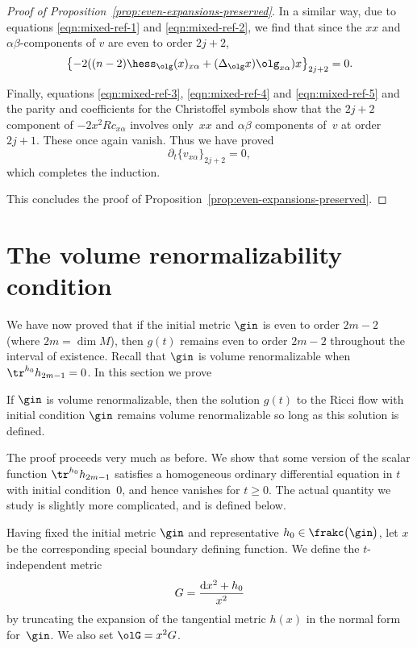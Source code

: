 \begin{proof}[Proof of Proposition~\ref{prop:even-expansions-preserved}]
In a similar way, due to equations \eqref{eqn:mixed-ref-1} and \eqref{eqn:mixed-ref-2}, we find that since the $xx$ and $\alpha \beta$-components of $v$ are even to order $2j+2$,
\begin{gather*} \big\{ {-}2 ( (n-2) \hess_{\olg} (x)_{x\alpha} + (\Delta_{\olg} x) \olg_{x \alpha} ) x\big\}_{2j+2} = 0.
\end{gather*}

Finally, equations \eqref{eqn:mixed-ref-3}, \eqref{eqn:mixed-ref-4} and \eqref{eqn:mixed-ref-5} and the parity and coefficients for the Christoffel symbols show that the $2j+2$ component of $-2 x^2 Rc_{x\alpha}$ involves only~$xx$ and $\alpha \beta$ components of~$v$ at order~$2j+1$. These once again vanish. Thus we have proved
\[ \partial_t \{v_{x \alpha}\}_{2j+2} = 0, \]
which completes the induction.

This concludes the proof of Proposition~\ref{prop:even-expansions-preserved}.
\end{proof}

\section{The volume renormalizability condition} \label{VRandRF}

We have now proved that if the initial metric $\gin$ is even to order $2m-2$ (where $2m = \dim M$), then $g(t)$ remains even to order $2m-2$ throughout the interval of existence. Recall that $\gin$ is volume renormalizable when $\tr^{h_0} h_{2m-1} = 0$. In this section we prove
\begin{Proposition} \label{prop:volume-renorm-preserved}If $\gin$ is volume renormalizable, then the solution $g(t)$ to the Ricci flow with initial condition $\gin$ remains volume renormalizable so long as this solution is defined.
\end{Proposition}

The proof proceeds very much as before. We show that some version of the scalar function $\tr^{h_0} h_{2m-1}$ satisfies a homogeneous ordinary differential equation in $t$ with initial condition~$0$, and hence vanishes for $t \geq 0$. The actual quantity we study is slightly more complicated, and is defined below.

Having fixed the initial metric $\gin$ and representative $h_0 \in \frakc\big(\gin\big)$, let $x$ be the corresponding special boundary defining function. We define the $t$-independent metric
\begin{gather*}%
G = \frac{{\rm d}x^2 + h_0}{x^2}
\end{gather*}
by truncating the expansion of the tangential metric $h(x)$ in the normal form for~$\gin$. We also set $\olG = x^2 G$.

